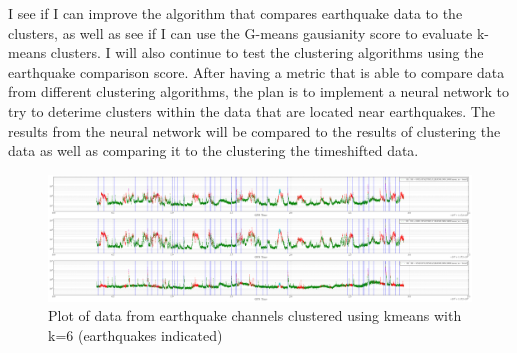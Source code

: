 \documentclass[colorlinks=true,pdfstartview=FitV,linkcolor=blue,
            citecolor=red,urlcolor=magenta]{ligodoc}
\begin{document}
\indent

\par I see if I can improve the algorithm that compares earthquake data to the clusters, as well as see if I can use the G-means gausianity score to evaluate k-means clusters. I will also continue to test the clustering algorithms using the earthquake comparison score.  After having a metric that is able to compare data from different clustering algorithms, the plan is to implement a neural network to try to deterime clusters within the data that are located near earthquakes. The results from the neural network will be compared to the results of clustering the data as well as comparing it to the clustering the timeshifted data.   

\begin{figure}[htbp]
\begin{center}
\includegraphics[width=1.3\textwidth,angle=90]{EQdata_Kmeans_6_.png}
\caption{Plot of data from earthquake channels clustered using kmeans with k=6 (earthquakes indicated)}
\label{fig:image1}
\end{center}
\end{figure}
\end{document}
